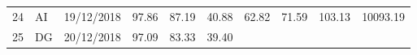 \documentclass[
  11pt,
]{article}
\begin{document}
\begin{longtable}[]{@{}llllllllll@{}}
\begin{minipage}[t]{0.05\columnwidth}\raggedright
24\strut
\end{minipage} & \begin{minipage}[t]{0.07\columnwidth}\raggedright
AI\strut
\end{minipage} & \begin{minipage}[t]{0.11\columnwidth}\raggedright
19/12/2018\strut
\end{minipage} & \begin{minipage}[t]{0.07\columnwidth}\raggedright
97.86\strut
\end{minipage} & \begin{minipage}[t]{0.07\columnwidth}\raggedright
87.19\strut
\end{minipage} & \begin{minipage}[t]{0.07\columnwidth}\raggedright
40.88\strut
\end{minipage} & \begin{minipage}[t]{0.07\columnwidth}\raggedright
62.82\strut
\end{minipage} & \begin{minipage}[t]{0.07\columnwidth}\raggedright
71.59\strut
\end{minipage} & \begin{minipage}[t]{0.08\columnwidth}\raggedright
103.13\strut
\end{minipage} & \begin{minipage}[t]{0.09\columnwidth}\raggedright
10093.19\strut
\end{minipage}\tabularnewline
\begin{minipage}[t]{0.05\columnwidth}\raggedright
25\strut
\end{minipage} & \begin{minipage}[t]{0.07\columnwidth}\raggedright
DG\strut
\end{minipage} & \begin{minipage}[t]{0.11\columnwidth}\raggedright
20/12/2018\strut
\end{minipage} & \begin{minipage}[t]{0.07\columnwidth}\raggedright
97.09\strut
\end{minipage} & \begin{minipage}[t]{0.07\columnwidth}\raggedright
83.33\strut
\end{minipage} & \begin{minipage}[t]{0.07\columnwidth}\raggedright
39.40\strut
\end{minipage} & \begin{minipage}[t]{0.07\columnwidth}\raggedright

\end{minipage}
\end{longtable}
\end{document}

